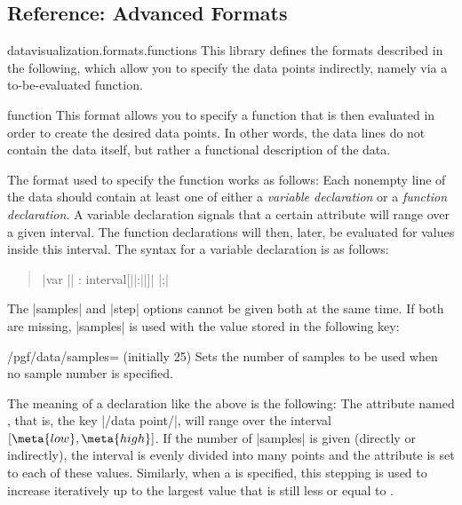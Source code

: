 \subsection{Reference: Advanced Formats}

\begin{tikzlibrary}{datavisualization.formats.functions}
  This library defines the formats described in the following, which
  allow you to specify the data points indirectly, namely via a
  to-be-evaluated function.

  \begin{dataformat}{function}
    This format allows you to specify a function that is then
    evaluated in order to create the desired data points. In other
    words, the data lines do not contain the data itself, but rather
    a functional description of the data.

    The format used to specify the function works as follows: Each
    nonempty line of the data should contain at least one of either a
    \emph{variable  declaration} or a \emph{function declaration}. A
    variable declaration signals that a certain attribute will range
    over a given interval. The function declarations will then, later,
    be evaluated for values inside this interval. The syntax for a
    variable declaration is as follows:
    \begin{quote}
      |var || : interval[||:||]|
       |;|
    \end{quote}
    The |samples| and |step| options cannot be given both at the same
    time. If both are missing, |samples| is used with the value stored
    in the following key:
    \begin{key}{/pgf/data/samples= (initially 25)}
      Sets the number of samples to be used when no sample number is
      specified.
    \end{key}
    The meaning of a declaration like the above is the following: The
    attribute named , that is, the key
    |/data point/|, will range over the interval
    $[\meta{low},\meta{high}]$. If the number of |samples| is given
    (directly or indirectly), the interval is evenly divided into
     many points and the attribute is set to each of
    these values. Similarly, when a  is specified, this
    stepping is used to increase  iteratively up to the
    largest value that is still less or equal to .


\end{dataformat}
\end{tikzlibrary}

